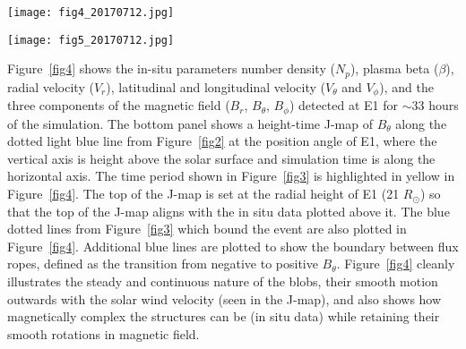 \documentclass[preprint]{aastex62}
\begin{document}

\begin{figure*}
	\centerline{ \texttt{[image: fig4\_20170712.jpg]} }
	\caption{The full time series of $N_p$, $\beta$, $\boldsymbol{V}$,
	$\boldsymbol{B}$ at E1. The bottom panel shows the height-time
	J-map \citep[after][]{Sheeley1999} of the Figure~\ref{fig2}
	${B_\theta}$ quantity that define the 3D flux rope boundaries
	(also shown as dashed vertical blue lines).\\ }
	\label{fig4}
\end{figure*}


\begin{figure*}
	\centerline{ \texttt{[image: fig5\_20170712.jpg]} }
	\caption{The E2 plasma and magnetic field time series and
	J-map, in the same format as Figure~\ref{fig4}.\\}
	\label{fig5}
\end{figure*}


Figure~\ref{fig4} shows the in-situ parameters number density
($N_p$), plasma beta ($\beta$), radial velocity ($V_r$), latitudinal
and longitudinal velocity ($V_\theta$ and $V_\phi$), and the three
components of the magnetic field ($B_r$, $B_\theta$, $B_\phi$)
detected at E1 for $\sim$33 hours of the simulation. The bottom
panel shows a height-time J-map \citep[after][]{Sheeley1999} of
$B_\theta$ along the dotted light blue line from Figure~\ref{fig2}
at the position angle of E1, where the vertical axis is height above
the solar surface and simulation time is along the horizontal axis.
The time period shown in Figure~\ref{fig3} is highlighted in yellow
in Figure~\ref{fig4}. The top of the J-map is set at the radial
height of E1 (21 $R_\odot$) so that the top of the J-map aligns
with the in situ data plotted above it. The blue dotted lines from
Figure~\ref{fig3} which bound the event are also plotted in
Figure~\ref{fig4}. Additional blue lines are plotted to show the
boundary between flux ropes, defined as the transition from negative
to positive $B_\theta$. Figure~\ref{fig4} cleanly illustrates the
steady and continuous nature of the blobs, their smooth motion
outwards with the solar wind velocity (seen in the J-map), and also
shows how magnetically complex the structures can be (in situ data)
while retaining their smooth rotations in magnetic field.
\end{document}
